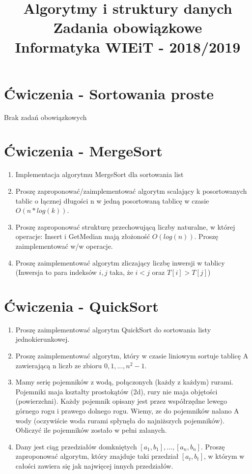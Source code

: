 \documentclass[11pt]{article}
\title{
	\textbf{
		\LARGE{Algorytmy i struktury danych}\linebreak \\
		\large{Zadania obowiązkowe} \\
		\normalsize{Informatyka WIEiT - 2018/2019 }} \\
}
\author{}
\date{}
\begin{document}
\maketitle

\section{Ćwiczenia - Sortowania proste}
	Brak zadań obowiązkowych
\section{Ćwiczenia - MergeSort}

\begin{enumerate}
	\item Implementacja algorytmu MergeSort dla sortowania list
	
	\item Proszę zaproponować/zaimplementować algorytm scalający k posortowanych tablic o łącznej długości n
	w jedną posortowaną tablicę w czasie $O(n*log(k))$.
	
	\item Proszę zaproponować strukturę przechowującą liczby naturalne, w której operacje:
	Insert i GetMedian mają złożoność $O(log(n))$.
	Proszę zaimplementować w/w operacje.
	
	\item Proszę zaimplementować algorytm zliczający liczbę inwersji w tablicy
	(Inwersja to para indeksów $i,j$ taka, że $ i<j $ oraz $T[i]>T[j] $)
\end{enumerate}

\section{Ćwiczenia - QuickSort}

\begin{enumerate}
	\item Proszę zaimplementować algorytm QuickSort do sortowania listy jednokierunkowej.
	
	\item Proszę zaimplementować algorytm, który w czasie liniowym sortuje tablicę A zawierającą n liczb ze zbioru $ 0,1, ... ,n^2-1 $.
	
	\item Mamy serię pojemników z wodą, połączonych (każdy z każdym) rurami.
	Pojemniki maja kształty prostokątów (2d), rury nie maja objętości (powierzchni).
	Każdy pojemnik opisany jest przez współrzędne lewego górnego rogu i prawego dolnego rogu.
	Wiemy, ze do pojemników nalano A wody (oczywiście woda rurami spłynęła do najniższych pojemników).
	Obliczyć ile pojemników zostało w pełni zalanych.
	
	\item Dany jest ciąg przedziałów domkniętych $ [a_{1}, b_{1}], . . . ,[a_{n}, b_{n}]$.
	Proszę zaproponować algorytm, który znajduje taki przedział $[a_{t}, b_{t}]$,
	w którym w całości zawiera się jak najwięcej innych przedziałów.
\end{enumerate}
\end{document}
